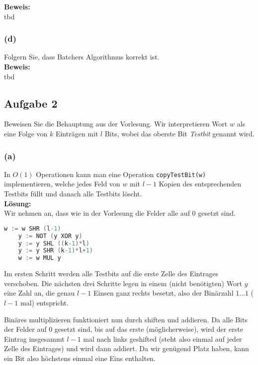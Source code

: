 \documentclass[11pt,a4paper,ngerman]{article}
\begin{document}
\noindent\textbf{Beweis:}\\

tbd

\subsubsection*{(d)}
Folgern Sie, dass Batchers Algorithmus korrekt ist.\\

\noindent\textbf{Beweis:}\\

tbd



\subsection*{Aufgabe 2}
Beweisen Sie die Behauptung aus der Vorlesung. Wir interpretieren Wort $w$ als eine Folge von $k$ Einträgen mit $l$ Bits, wobei das oberste Bit \emph{Testbit} genannt wird.

\subsubsection*{(a)}
In $O(1)$ Operationen kann man eine Operation \lstinline|copyTestBit(w)| implementieren, welche jedes Feld von $w$ mit $l-1$ Kopien des entsprechenden Testbits füllt und danach alle Testbits löscht.\\

\noindent\textbf{Lösung:}\\

Wir nehmen an, dass wie in der Vorlesung die Felder alle auf $0$ gesetzt sind.

\begin{lstlisting}[frame=single, language=C,morekeywords={:=,SHR,SHL,NOT,XOR,AND,OR,MUL}]
	w := w SHR (l-1)
	y := NOT (y XOR y)
	y := y SHL ((k-1)*l)
	y := y SHR (k-1)*l+1)
	w := w MUL y
\end{lstlisting}

Im ersten Schritt werden alle Testbits auf die erste Zelle des Eintrages verschoben. Die nächsten drei Schritte
legen in einem (nicht benötigten) Wort $y$ eine Zahl an, die genau $l-1$ Einsen ganz rechts besetzt, also der Binärzahl
$1\ldots1$ ($l-1$ mal) entspricht.

Binäres multiplizieren funktioniert nun durch shiften und addieren. Da alle Bits der Felder auf $0$ gesetzt sind, bis auf das erste (möglicherweise),
wird der erste Eintrag insgesammt $l-1$ mal nach links geshifted (steht also einmal auf jeder Zelle des Eintrages) und wird dann addiert.
Da wir genügend Platz haben, kann ein Bit also höchstens einmal eine Eins enthalten.
\end{document}
